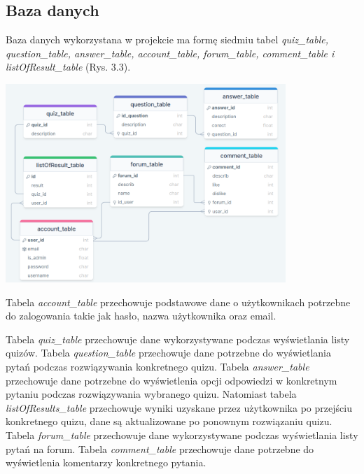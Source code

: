\documentclass[10pt,a4paper]{report}
\begin{document}
\begin{adjustwidth}{2cm}{2cm}
\section{Baza danych}
\begin{minipage}{1\linewidth}
Baza danych wykorzystana w projekcie ma formę siedmiu tabel \textit{quiz\_table, question\_table, answer\_table, account\_table, forum\_table, comment\_table i listOfResult\_table} (Rys. 3.3).
\vspace{0.3cm}
\end{minipage}
 \begin{minipage}{\linewidth}
\begin{center}
  \includegraphics[width=400px]{img/database.png}
\end{center}
\end{minipage}
\begin{minipage}{1\linewidth}
\vspace{0.2cm}
Tabela \textit{account\_table} przechowuje podstawowe dane o użytkownikach potrzebne do zalogowania takie jak hasło, nazwa użytkownika oraz email. 
\end{minipage}  
\begin{minipage}{1\linewidth}
Tabela  \textit{quiz\_table} przechowuje dane wykorzystywane podczas wyświetlania listy quizów. 
Tabela \textit{question\_table} przechowuje dane potrzebne do wyświetlania pytań podczas rozwiązywania konkretnego quizu. Tabela \textit{answer\_table} przechowuje dane potrzebne do wyświetlenia opcji odpowiedzi w konkretnym pytaniu podczas rozwiązywania wybranego quizu. Natomiast tabela \textit{listOfResults\_table} przechowuje wyniki uzyskane przez użytkownika po przejściu konkretnego quizu, dane są aktualizowane po ponownym rozwiązaniu quizu. Tabela \textit{forum\_table} przechowuje dane wykorzystywane podczas wyświetlania listy pytań na forum. Tabela \textit{comment\_table} przechowuje dane potrzebne do wyświetlenia komentarzy konkretnego pytania. 
\end{minipage}

\end{adjustwidth}
\end{document}
